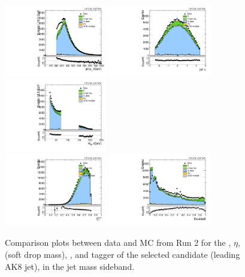 \begin{figure}[htbp]
  \centering
  \includegraphics[width=0.4\textwidth]{fig/analysis/SB_b1_allL_allP_allC_allE_Run2_lnujj_l2_pt.pdf}
  \includegraphics[width=0.4\textwidth]{fig/analysis/SB_b1_allL_allP_allC_allE_Run2_lnujj_l2_eta.pdf}\\
  \includegraphics[width=0.4\textwidth]{fig/analysis/SB_b1_allL_allP_allC_allE_Run2_mjet.pdf}\\
  \includegraphics[width=0.4\textwidth]{fig/analysis/SB_b1_allL_allP_allC_allE_Run2_tau21DDT.pdf}
  \includegraphics[width=0.4\textwidth]{fig/analysis/SB_b1_allL_allP_allC_allE_Run2_DoubleB.pdf}\\
  \caption{
    Comparison plots between data and MC from Run 2 for the \pt, $\eta$, \MJ (soft drop mass), \nsubjDDT, and \DoubleB tagger of the selected \Vhad candidate (leading AK8 jet), in the jet mass sideband.
  }
  \label{fig:SB_controlPlotsRun2_3}
\end{figure}


